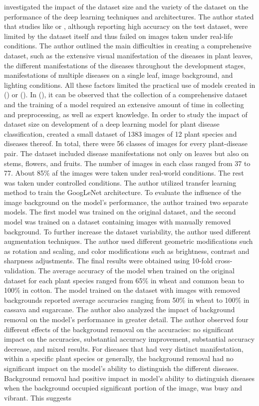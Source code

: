 \documentclass{BachelorBUI}
\begin{document}
\textcite{Barbedo:2018:1} investigated the impact of the dataset size and the variety of the dataset on the performance of the deep learning techniques and architectures. The author stated that studies like \cite{Mohanty:2016} or \cite{Ferentinos:2018}, although reporting high accuracy on the test dataset, were limited by the dataset itself and thus failed on images taken under real-life conditions. The author outlined the main difficulties in creating a comprehensive dataset, such as the extensive visual manifestation of the diseases in plant leaves, the different manifestations of the diseases throughout the development stages, manifestations of multiple diseases on a single leaf, image background, and lighting conditions. All these factors limited the practical use of models created in (\cite{Mohanty:2016}) or (\cite{Ferentinos:2018}). In (\cite{Picon:2019}), it can be observed that the collection of a comprehensive dataset and the training of a model required an extensive amount of time in collecting and preprocessing, as well as expert knowledge. In order to study the impact of dataset size on development of a deep learning model for plant disease classification, \textcite{Barbedo:2018:1} created a small dataset of 1383 images of 12 plant species and diseases thereof. In total, there were 56 classes of images for every plant-disease pair. The dataset included disease manifestations not only on leaves but also on stems, flowers, and fruits. The number of images in each class ranged from 37 to 77. About 85\% af the images were taken under real-world conditions. The rest was taken under controlled conditions. The author utilized transfer learning method to train the GoogLeNet architecture. To evaluate the influence of the image background on the model's performance, the author trained two separate models. The first model was trained on the original dataset, and the second model was trained on a dataset containing images with manually removed background. To further increase the dataset variability, the author used different augmentation techniques. The author used different geometric modifications such as rotation and scaling, and color modifications such as brightness, contrast and sharpness adjustments. The final results were obtained using 10-fold cross-validation. The average accuracy of the model when trained on the original dataset for each plant species ranged from 65\% in wheat and common bean to 100\% in cotton. The model trained on the dataset with images with removed backgrounds reported average accuracies ranging from 50\% in wheat to 100\% in cassava and sugarcane. The author also analyzed the impact of background removal on the model's performance in greater detail. The author observed four different effects of the background removal on the accuracies: no significant impact on the accuracies, substantial accuracy improvement, substantial accuracy decrease, and mixed results. For diseases that had very distinct manifestation, within a specific plant species or generally, the background removal had no significant impact on the model's ability to distinguish the different diseases. Background removal had positive impact in model's ability to distinguish diseases when the background occupied significant portion of the image, was busy and vibrant. This suggests 
\end{document}
